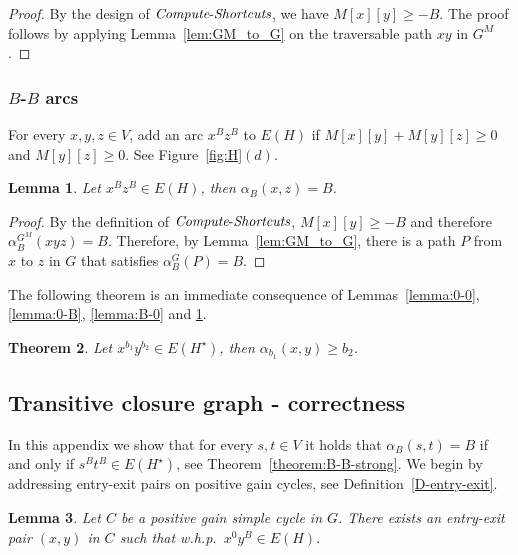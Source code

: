 \documentclass[11pt]{article}
\newtheorem{theorem}{Theorem}[section]
\newtheorem{lemma}[theorem]{Lemma}
\newcommand{\ComputeS}{\mbox{{\it Compute}-{\it Shortcuts}}}
\begin{document}
\begin{proof}
    By the design of $\ComputeS$, we have $M[x][y] \ge -B$. The proof follows by applying Lemma~\ref{lem:GM_to_G} on the traversable path $xy$ in $G^M$.
\end{proof}


\subsubsection{\texorpdfstring{$B$-$B$}{B-B} arcs}
For every $x,y,z\in V$, add an arc $x^B z^B$ to $E(H)$ if $M[x][y]+M[y][z]\ge 0$ and $M[y][z]\ge 0$. See Figure~\ref{fig:H}$(d)$. 

\begin{lemma}\label{lemma:B-B}
    Let $x^B z^B \in E(H)$, then  $\alpha_B(x,z) = B$. 
\end{lemma}

\begin{proof}
    By the definition of $\ComputeS$,  $M[x][y]\ge -B$ and therefore $\alpha^{G^M}_B(xyz)=B$. Therefore, by Lemma~\ref{lem:GM_to_G}, there is a path $P$ from $x$ to $z$ in $G$ that satisfies $\alpha^G_B(P)=B$.
\end{proof}



The following theorem is an immediate consequence of Lemmas~\ref{lemma:0-0}, \ref{lemma:0-B}, \ref{lemma:B-0} and \ref{lemma:B-B}.

\begin{theorem}\label{theorem:trasitive-graph}
    Let $x^{b_1} y^{b_2} \in E(H^\star)$,
    then  $\alpha_{b_1}(x,y)\ge b_2$.
\end{theorem}

\subsection{Transitive closure graph - correctness}\label{section:transitive-correctness}
In this appendix we show that for every $s,t\in V$ it holds that $\alpha_B(s,t)=B$ if and only if $s^B t^B \in E(H^\star)$, see Theorem~\ref{theorem:B-B-strong}. We begin by addressing entry-exit pairs on positive gain cycles, see Definition~\ref{D-entry-exit}. 


\begin{lemma}\label{lemma:special-entry-exit}
    Let $C$ be a positive gain simple cycle in $G$. There exists an entry-exit pair $(x,y)$ in $C$ such that w.h.p.\ $x^0 y^B \in E(H)$.
\end{lemma}
\end{document}
